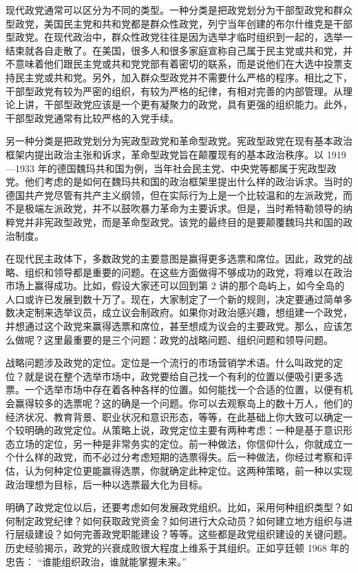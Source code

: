 现代政党通常可以区分为不同的类型。一种分类是把政党划分为干部型政党和群众型政党，美国民主党和共和党都是群众性政党，列宁当年创建的布尔什维克是干部型政党。在现代政治中，群众性政党往往是因为选举才临时组织到一起的，选举一结束就各自走散了。在美国，很多人和很多家庭宣称自己属于民主党或共和党，并不意味着他们跟民主党或共和党党部有着密切的联系，而是说他们在大选中投票支持民主党或共和党。另外，加入群众型政党并不需要什么严格的程序。相比之下，干部型政党有较为严密的组织，有较为严格的纪律，有相对完善的内部管理。从理论上讲，干部型政党应该是一个更有凝聚力的政党，具有更强的组织能力。此外，干部型政党通常有比较严格的入党手续。

另一种分类是把政党划分为宪政型政党和革命型政党。宪政型政党在现有基本政治框架内提出政治主张和诉求，革命型政党旨在颠覆现有的基本政治秩序。以 1919—1933 年的德国魏玛共和国为例，当年社会民主党、中央党等都属于宪政型政党。他们考虑的是如何在魏玛共和国的政治框架里提出什么样的政治诉求。当时的德国共产党尽管有共产主义纲领，但在实际行为上是一个比较温和的左派政党，而不是极端左派政党，并不以鼓吹暴力革命为主要诉求。但是，当时希特勒领导的纳粹党并非宪政型政党，而是革命型政党。该党的最终目的是要颠覆魏玛共和国的政治制度。

在现代民主政体下，多数政党的主要意图是赢得更多选票和席位。因此，政党的战略、组织和领导都是重要的问题。在这些方面做得不够成功的政党，将难以在政治市场上赢得成功。比如，假设大家还可以回到第 2 讲的那个岛屿上，如今全岛的人口或许已发展到数十万了。现在，大家制定了一个新的规则，决定要通过简单多数决定制来选举议员，成立议会制政府。如果你对政治感兴趣，想组建一个政党，并想通过这个政党来赢得选票和席位，甚至想成为议会的主要政党。那么，应该怎么做呢？这里最重要的是三个问题：政党的战略问题、组织问题和领导问题。

战略问题涉及政党的定位。定位是一个流行的市场营销学术语。什么叫政党的定位？就是说在整个选举市场中，政党要给自己找一个有利的位置以便吸引更多选票。一个选举市场中存在着各种各样的位置。如何能找一个合适的位置，以便有机会赢得较多的选票呢？这的确是一个问题。你可以去观察岛上的数十万人，他们的经济状况、教育背景、职业状况和意识形态，等等，在此基础上你大致可以确定一个较明确的政党定位。从策略上说，政党定位主要有两种考虑：一种是基于意识形态立场的定位，另一种是非常务实的定位。前一种做法，你信仰什么，你就成立一个什么样的政党，而不必过分考虑短期的选票得失。后一种做法，你经过考察和评估，认为何种定位更能赢得选票，你就确定此种定位。这两种策略，前一种以实现政治理想为目标，后一种以选票最大化为目标。

明确了政党定位以后，还要考虑如何发展政党组织。比如，采用何种组织类型？如何制定政党纪律？如何获取政党资金？如何进行大众动员？如何建立地方组织与进行层级建设？如何完善政党职能建设？等等。这些都是政党组织建设的关键问题。历史经验揭示，政党的兴衰成败很大程度上维系于其组织。正如亨廷顿 1968 年的忠告： “谁能组织政治，谁就能掌握未来。” 

